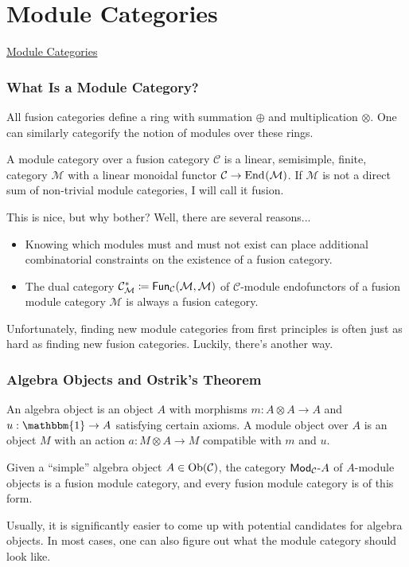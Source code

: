 \documentclass{beamer}
\theoremstyle{plain}
\theoremstyle{definition}
\newcommand{\mathcat}[1]{\mathcal{#1}}
\newcommand{\Ob}{\textup{Ob}}
\newcommand{\End}[2][]{
	\ifthenelse{\equal{#2}{}}
		{\textup{End}_{#1}}
		{\textup{End}_{#1}\!\left(#2\right)}
}
\newcommand{\Fun}[2][]{
	\ifthenelse{\equal{#2}{}}
		{\textcat{Fun}_{#1}}
		{\textcat{Fun}_{#1}\!\left(#2\right)}
}
\newcommand{\textcat}[1]{\textup{\textsf{#1}}}
\newcommand{\rmodcat}[2][]{\textcat{Mod}_{#1}\textcat{-}#2}
\begin{document}

\section{Module Categories}

\begin{frame}
\centerline{\Huge\textcolor{structure}{\underline{Module Categories}}}
\end{frame}

\begin{frame}
\frametitle{What Is a Module Category?}
All fusion categories define a ring with summation $\oplus$ and multiplication $\otimes$. One can similarly categorify the notion of modules over these rings.
\begin{definition}
A \textcolor{structure}{module category} over a fusion category $\mathcat{C}$ is a linear, semisimple, finite, category $\mathcat{M}$ with a linear monoidal functor $\mathcat{C} \to \End{\mathcat{M}}$. If $\mathcat{M}$ is not a direct sum of non-trivial module categories, I will call it \textcolor{structure}{fusion}.
\end{definition}
This is nice, but why bother? Well, there are several reasons...
\medskip
\begin{itemize}
	\item Knowing which modules must and must not exist can place additional combinatorial constraints on the existence of a fusion category.
	\item The \textcolor{structure}{dual category $\mathcat{C}_{\mathcat{M}}^{*} \coloneqq \Fun[\mathcat{C}]{\mathcat{M}, \mathcat{M}}$} of $\mathcat{C}$-module endofunctors of a fusion module category $\mathcat{M}$ is always a fusion category.
\end{itemize}
\medskip
Unfortunately, finding new module categories from first principles is often just as hard as finding new fusion categories. Luckily, there's another way.
\end{frame}

\begin{frame}
\frametitle{Algebra Objects and Ostrik's Theorem}
\begin{definition}
An \textcolor{structure}{algebra object} is an object $A$ with morphisms $m : A \otimes A \to A$ and $u : \mathbbm{1} \to A$ satisfying certain axioms. A \textcolor{structure}{module object} over $A$ is an object $M$ with an action $a : M \otimes A \to M$ compatible with $m$ and $u$.
\end{definition}
\begin{theorem}
Given a ``simple'' algebra object $A \in \Ob(\mathcat{C})$, the category $\rmodcat[\mathcat{C}]{A}$ of $A$-module objects is a fusion module category, and every fusion module category is of this form.
\end{theorem}
Usually, it is significantly easier to come up with potential candidates for algebra objects. In most cases, one can also figure out what the module category should look like.
\end{frame}
\end{document}
